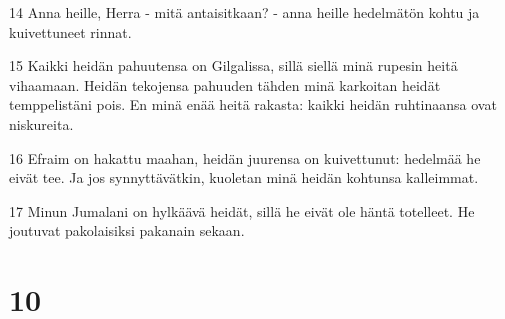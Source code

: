 \par 14 Anna heille, Herra - mitä antaisitkaan? - anna heille hedelmätön kohtu ja kuivettuneet rinnat.
\par 15 Kaikki heidän pahuutensa on Gilgalissa, sillä siellä minä rupesin heitä vihaamaan. Heidän tekojensa pahuuden tähden minä karkoitan heidät temppelistäni pois. En minä enää heitä rakasta: kaikki heidän ruhtinaansa ovat niskureita.
\par 16 Efraim on hakattu maahan, heidän juurensa on kuivettunut: hedelmää he eivät tee. Ja jos synnyttävätkin, kuoletan minä heidän kohtunsa kalleimmat.
\par 17 Minun Jumalani on hylkäävä heidät, sillä he eivät ole häntä totelleet. He joutuvat pakolaisiksi pakanain sekaan.

\chapter{10}

